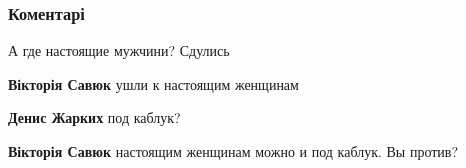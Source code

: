  
 
 
 
 
\subsubsection{Коментарі}

\begin{itemize} %
 
А где настоящие мужчини? Сдулись

\begin{itemize} %
 
\textbf{Вікторія Савюк} ушли к настоящим женщинам

 
\textbf{Денис Жарких} под каблук?

 
\textbf{Вікторія Савюк} настоящим женщинам можно и под каблук. Вы против?

 

\end{itemize}
\end{itemize}
